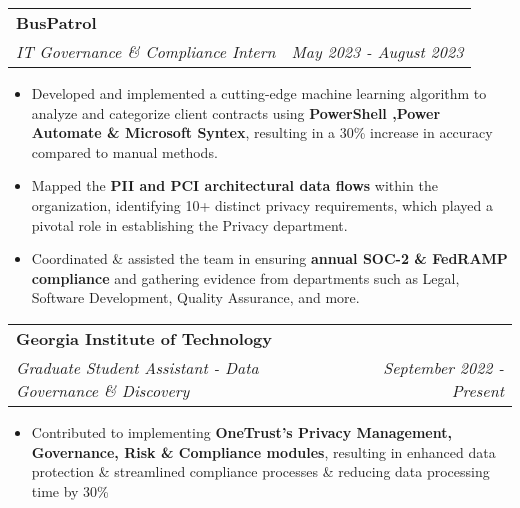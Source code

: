 \documentclass[letterpaper,11pt]{article}
\makeatletter
\newcommand{\resumeItem}[1]{
  \item\small{
    {#1 \vspace{-2pt}}
  }
}
\newcommand{\resumeSubheading}[4]{
  \vspace{-2pt}\item
    \begin{tabular*}{0.97\textwidth}[t]{l@{\extracolsep{\fill}}r}
      \textbf{#1} & #2 \\
      \textit{\small#3} & \textit{\small #4} \\
    \end{tabular*}\vspace{0pt}
}
\newcommand{\resumeItemListStart}{\begin{itemize}}
\newcommand{\resumeItemListEnd}{\end{itemize}\vspace{-5pt}}
\makeatother
\begin{document}
    
    \resumeSubheading
          {BusPatrol}{}
          {IT Governance \& Compliance Intern}{May 2023 - August 2023}
          \resumeItemListStart
            \resumeItem{}
            {Developed and implemented a cutting-edge machine learning algorithm to analyze and categorize client contracts using \textbf{PowerShell ,Power Automate \& Microsoft Syntex}, resulting in a 30\% increase in accuracy compared to manual methods.}
            \resumeItem{}
            {Mapped the \textbf{PII and PCI architectural data flows} within the organization, identifying 10+ distinct privacy requirements, which played a pivotal role in establishing the Privacy department.}
            \resumeItem{}
            {Coordinated \& assisted the team in ensuring \textbf{annual SOC-2 \& FedRAMP compliance} and gathering evidence from departments such as Legal, Software Development, Quality Assurance, and more.}
            \resumeItemListEnd
        
        
        
    

   \resumeSubheading
   {Georgia Institute of Technology}{}
   {Graduate Student Assistant - Data Governance \& Discovery}{September 2022 - Present}
   \resumeItemListStart
        \resumeItem{}
        {Contributed to implementing \textbf{OneTrust's Privacy Management, Governance, Risk \& Compliance modules}, resulting in enhanced data protection \& streamlined compliance processes \& reducing data processing time by 30\% } %
        \resumeItemListEnd
   
\end{document}
